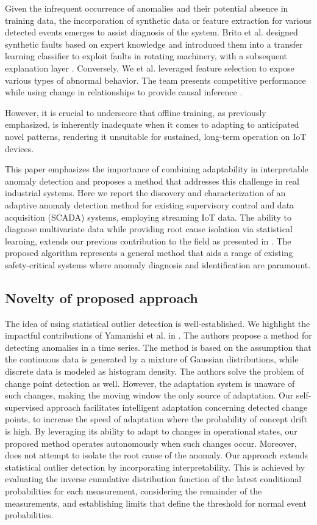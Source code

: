 Given the infrequent occurrence of anomalies and their potential absence in training data, the incorporation of synthetic data or feature extraction for various detected events emerges to assist diagnosis of the system. Brito et al. designed synthetic faults based on expert knowledge and introduced them into a transfer learning classifier to exploit faults in rotating machinery, with a subsequent explanation layer \citep{BRITO2023120860}. Conversely, We et al. leveraged feature selection to expose various types of abnormal behavior. The team presents competitive performance while using change in relationships to provide causal inference \citep{WU2024121539}.

However, it is crucial to underscore that offline training, as previously emphasized, is inherently inadequate when it comes to adapting to anticipated novel patterns, rendering it unsuitable for sustained, long-term operation on IoT devices.

This paper emphasizes the importance of combining adaptability in interpretable anomaly detection and proposes a method that addresses this challenge in real industrial systems. Here we report the discovery and characterization of an adaptive anomaly detection method for existing supervisory control and data acquisition (SCADA) systems, employing streaming IoT data. The ability to diagnose multivariate data while providing root cause isolation via statistical learning, extends our previous contribution to the field as presented in \citep{Wadinger2023}. The proposed algorithm represents a general method that aids a range of existing safety-critical systems where anomaly diagnosis and identification are paramount.

\subsection{Novelty of proposed approach}
The idea of using statistical outlier detection is well-established. We highlight the impactful contributions of Yamanishi et al. in \citep{Yamanishi2002, Yamanishi2004}. The authors propose a method for detecting anomalies in a time series. The method is based on the assumption that the continuous data is generated by a mixture of Gaussian distributions, while discrete data is modeled as histogram density. The authors solve the problem of change point detection as well. However, the adaptation system is unaware of such changes, making the moving window the only source of adaptation. Our self-supervised approach facilitates intelligent adaptation concerning detected change points, to increase the speed of adaptation where the probability of concept drift is high. By leveraging its ability to adapt to changes in operational states, our proposed method operates autonomously when such changes occur. Moreover, \citet{Yamanishi2004} does not attempt to isolate the root cause of the anomaly. Our approach extends statistical outlier detection by incorporating interpretability. This is achieved by evaluating the inverse cumulative distribution function of the latest conditional probabilities for each measurement, considering the remainder of the measurements, and establishing limits that define the threshold for normal event probabilities.

